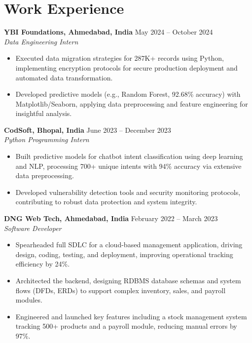 \documentclass[a4paper,10pt]{article}
\begin{document}
\vspace{-4mm}

\section*{Work Experience}
\textbf{YBI Foundations, Ahmedabad, India} \hfill May 2024 -- October 2024\\
\textit{Data Engineering Intern} \\
\begin{itemize}[leftmargin=*, itemsep=0pt, parsep=1pt]
\vspace{-6mm}
\item Executed data migration strategies for 287K+ records using Python, implementing encryption protocols for secure production deployment and automated data transformation.
\item Developed predictive models (e.g., Random Forest, 92.68\% accuracy) with Matplotlib/Seaborn, applying data preprocessing and feature engineering for insightful analysis.
\end{itemize}
\textbf{CodSoft, Bhopal, India} \hfill June 2023 -- December 2023\\
\textit{Python Programming Intern} \\
\begin{itemize}[leftmargin=*, itemsep=0pt, parsep=1pt]
\vspace{-6mm}
\item Built predictive models for chatbot intent classification using deep learning and NLP, processing 700+ unique intents with 94\% accuracy via extensive data preprocessing.
\item Developed vulnerability detection tools and security monitoring protocols, contributing to robust data protection and system integrity.
\vspace{-1mm}
\end{itemize}

\textbf{DNG Web Tech, Ahmedabad, India} \hfill February 2022 -- March 2023 \\
\textit{Software Developer} \\

\begin{itemize}[leftmargin=*, itemsep=0pt, parsep=1pt] %
\vspace{-7mm}
    \item Spearheaded full SDLC for a cloud-based management application, driving design, coding, testing, and deployment, improving operational tracking efficiency by 24\%.
\item Architected the backend, designing RDBMS database schemas and system flows (DFDs, ERDs) to support complex inventory, sales, and payroll modules.
\item Engineered and launched key features including a stock management system tracking 500+ products and a payroll module, reducing manual errors by 97\%. 

\end{itemize}
\end{document}

